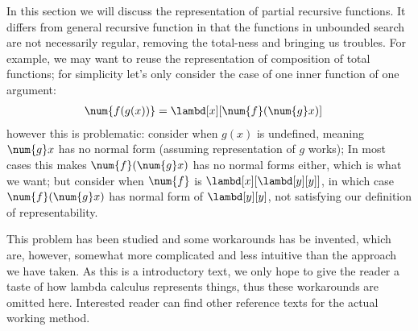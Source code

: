 \documentclass[../../../include/open-logic-section]{subfiles}
\begin{document}

In this section we will discuss the representation of partial
recursive functions. It differs from general recursive function in
that the functions in unbounded search are not necessarily
regular, removing the total-ness and bringing us troubles. For example, we may want to
reuse the representation of composition of total
functions; for simplicity let's only consider the case of one inner
function of one argument:
\begin{align*}
  \num{f(g(x))} &= \lambd[x][\num{f} (\num{g} x)]
\end{align*}
however this is problematic: consider when $g(x)$ is
undefined, meaning $\num{g} x$ has no normal
form (assuming representation of $g$ works); In most cases this makes
$\num{f} (\num{g} x)$ has no normal forms either, which is what we want; but consider when
$\num{f}$ is $\lambd[x][\lambd[y][y]]$, in which case $\num{f}
(\num{g} x)$ has normal form of $\lambd[y][y]$, not
satisfying our definition of representability.

This problem has been studied and some workarounds has be invented, 
which are, however, somewhat more complicated and less intuitive than the
approach we have taken. As this is a introductory text, we only hope to
give the reader a taste of how lambda calculus represents things, thus
these workarounds are omitted here. Interested reader can find other
reference texts for the actual working method.
\end{document}
